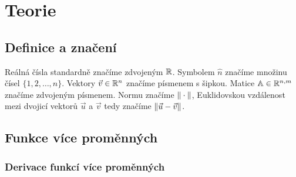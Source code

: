 \chapter{Teorie}

\section{Definice a značení}

Reálná čísla standardně značíme zdvojeným $\mathbb{R}$. Symbolem $\hat n$ značíme množinu čísel $\{1, 2, \ldots, n\}$. Vektory $\vec{v} \in \mathbb{R}^n$ značíme písmenem s šipkou. Matice $\mathbb{A} \in \mathbb{R}^{n, m}$ značíme zdvojeným písmenem. Normu značíme $\|\cdot\|$, Euklidovskou vzdálenost mezi dvojicí vektorů $\vec{u}$ a $\vec{v}$ tedy značíme $\|\vec{u} - \vec{v}\|$.

\section{Funkce více proměnných}

\subsection{Derivace funkcí více proměnných}





